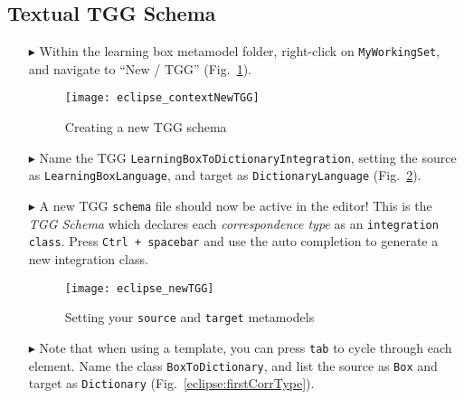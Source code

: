 \newpage
\hypertarget{schema tex}{}
\subsection{Textual TGG Schema}
\texHeader

\begin{itemize}

\item[$\blacktriangleright$] Within the learning box metamodel folder, right-click on \texttt{MyWorkingSet}, and navigate to ``New / TGG''
(Fig.~\ref{eclipse:contextTGG}).

\vspace{0.5cm}

\begin{figure}[htbp]
\begin{center}
  \texttt{[image: eclipse\_contextNewTGG]}
  \caption{Creating a new TGG schema}
  \label{eclipse:contextTGG}
\end{center}
\end{figure}

\item[$\blacktriangleright$] Name the TGG \texttt{LearningBoxToDictionaryIntegration}, setting the source as \texttt{LearningBoxLanguage}, and target as
\texttt{DictionaryLanguage} (Fig.~\ref{eclipse:newTGG}).

\vspace{0.5cm}

\item[$\blacktriangleright$] A new TGG \texttt{schema} file should now be active in the editor! This is the \emph{TGG Schema} which declares each
\emph{correspondence type} as an \texttt{integration class}. Press \texttt{Ctrl + spacebar} and use the auto completion to generate a new integration class.

\newpage

\begin{figure}[htbp]
\begin{center}
  \texttt{[image: eclipse\_newTGG]}
  \caption{Setting your \texttt{source} and \texttt{target} metamodels}
  \label{eclipse:newTGG}
\end{center}
\end{figure}

\item[$\blacktriangleright$] Note that when using a template, you can press \texttt{tab} to cycle through each element. Name the class
\texttt{BoxToDictionary}, and list the source as \texttt{Box} and target as \texttt{Dictionary} (Fig.~\ref{eclipse:firstCorrType}). 


\end{itemize}

